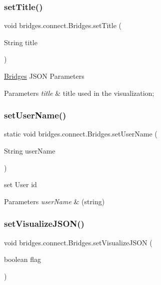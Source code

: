 \subsubsection{\texorpdfstring{set\+Title()}{setTitle()}}
{\footnotesize\ttfamily void bridges.\+connect.\+Bridges.\+set\+Title (\begin{DoxyParamCaption}\item[{String}]{title }\end{DoxyParamCaption})}

\mbox{\hyperlink{classbridges_1_1connect_1_1_bridges}{Bridges}} J\+S\+ON Parameters


\begin{DoxyParams}{Parameters}
{\em title} & title used in the visualization; \\
\hline
\end{DoxyParams}
\mbox{\label{classbridges_1_1connect_1_1_bridges_af9b9a2ca03ba02c0c2be4716594678a6}} 
\subsubsection{\texorpdfstring{set\+User\+Name()}{setUserName()}}
{\footnotesize\ttfamily static void bridges.\+connect.\+Bridges.\+set\+User\+Name (\begin{DoxyParamCaption}\item[{String}]{user\+Name }\end{DoxyParamCaption})\hspace{0.3cm}{\ttfamily [static]}}

set User id


\begin{DoxyParams}{Parameters}
{\em user\+Name} & (string) \\
\hline
\end{DoxyParams}
\mbox{\label{classbridges_1_1connect_1_1_bridges_aa502aa32a9ac482da9c8455c6810b64d}} 
\subsubsection{\texorpdfstring{set\+Visualize\+J\+S\+O\+N()}{setVisualizeJSON()}}
{\footnotesize\ttfamily void bridges.\+connect.\+Bridges.\+set\+Visualize\+J\+S\+ON (\begin{DoxyParamCaption}\item[{boolean}]{flag }\end{DoxyParamCaption})}


